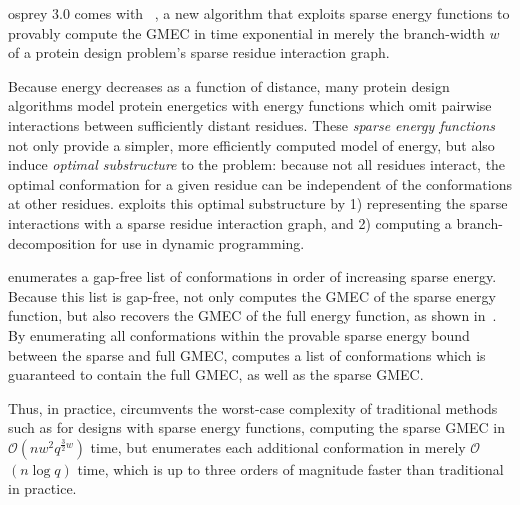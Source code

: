 \def\Oh{$\mathcal{O}$}

{\sc osprey} 3.0 comes with {\bwmstar}~\cite{BWM*}, a new algorithm that exploits sparse energy functions to provably compute the GMEC in time exponential in merely the branch-width $w$ of a protein design problem's sparse residue interaction graph.

Because energy decreases as a function of distance, many protein design algorithms model protein energetics with energy functions which omit pairwise interactions between sufficiently distant residues. These \emph{sparse energy functions} not only provide a simpler, more efficiently computed model of energy, but also induce \emph{optimal substructure} to the problem: because not all residues interact, the optimal conformation for a given residue can be independent of the conformations at other residues. {\bwmstar} exploits this optimal substructure by 1) representing the sparse interactions with a sparse residue interaction graph, and 2) computing a branch-decomposition for use in dynamic programming. 

{\bwmstar} enumerates a gap-free list of conformations in order of increasing sparse energy. Because this list is gap-free, {\bwmstar} not only computes the GMEC of the sparse energy function, but also recovers the GMEC of the full energy function, as shown in~\cite{BWM*}. By enumerating all conformations within the provable sparse energy bound between the sparse and full GMEC, {\bwmstar} computes a list of conformations which is guaranteed to contain the full GMEC, as well as the sparse GMEC.

Thus, in practice, {\bwmstar} circumvents the worst-case complexity of traditional methods such as \as for designs with sparse energy functions, computing the sparse GMEC in \Oh$(nw^2q^{\frac{3}{2}w})$ time, but enumerates each additional conformation in merely \Oh$(n\log q)$ time, which is up to three orders of magnitude faster than traditional \as in practice.